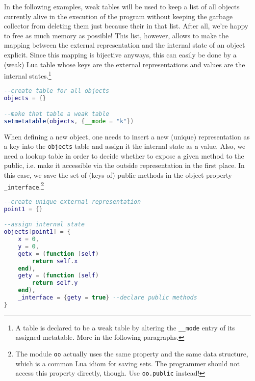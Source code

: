 In the following examples, weak tables will be used to keep a list of all objects currently alive in the execution of the program without keeping the garbage collector from deleting them just because their in that list. After all, we're happy to free as much memory as possible! This list, however, allows to make the mapping between the external representation and the internal state of an object explicit. Since this mapping is bijective anyways, this can easily be done by a (weak) Lua table whose keys are the external representations and values are the internal states.\footnote{A table is declared to be a weak table by altering the \texttt{\_\_mode} entry of its assigned metatable. More in the following paragraphs.}

\begin{lstlisting}[language=lua, caption={Defining a global weak table in order to list all objects in the progam}, label=lst:tab1, name=lst:tab]
--create table for all objects
objects = {}

--make that table a weak table
setmetatable(objects, {__mode = "k"})
\end{lstlisting}

When defining a new object, one needs to insert a new (unique) representation as a key into the \texttt{objects} table and assign it the internal state as a value. Also, we need a lookup table in order to decide whether to expose a given method to the public, i.e. make it accessible via the outside representation in the first place. In this case, we save the set of (keys of) public methods in the object property \texttt{\_interface}.\footnote{The module \texttt{oo} actually uses the same property and the same data structure, which is a common Lua idiom for saving sets. The programmer should not access this property directly, though. Use \texttt{oo.public} instead!}

\begin{lstlisting}[language=lua, caption={Possible implementation of a point object using a global weak table (continued froom listing \ref{lst:tab1})}, label=lst:tab2, name=lst:tab]
--create unique external representation
point1 = {}

--assign internal state
objects[point1] = {
	x = 0,
	y = 0,
	getx = (function (self)
		return self.x
	end),
	gety = (function (self)
		return self.y
	end),
	_interface = {gety = true} --declare public methods
}
\end{lstlisting}


